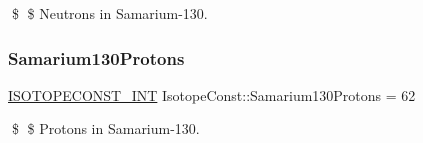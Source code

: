 \$ \$ Neutrons in Samarium-\/130. \mbox{\label{group___isotope_const-_samarium-_sm130_gabf318ac7a264d4253074f868b42b9844}} 
\subsubsection{\texorpdfstring{Samarium130\+Protons}{Samarium130Protons}}
{\footnotesize\ttfamily \mbox{\hyperlink{group___isotope_const-_macros_ga5f18360b3e99483a35c32d789e62621c}{I\+S\+O\+T\+O\+P\+E\+C\+O\+N\+S\+T\+\_\+\+I\+NT}} Isotope\+Const\+::\+Samarium130\+Protons = 62}

\$ \$ Protons in Samarium-\/130. 